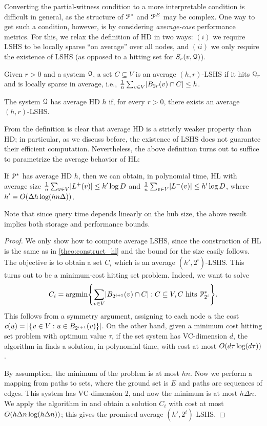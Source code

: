 Converting the partial-witness condition to a more interpretable condition is difficult in general, as the structure of $\mathcal{P}^*$ and $\mathcal{P}^E$ may be complex. 
One way to get such a condition, however, is by considering \emph{average-case} performance metrics.
For this, we relax the definition of HD in two ways: $(i)$ we require LSHS to be locally sparse ``on average'' over all nodes, and
$(ii)$ we only require the existence of LSHS (as opposed to a hitting set for $S_r(v,\mathcal{Q})$).

\begin{definition}
Given $r>0$ and a system $\mathcal{Q}$, a set $C\subseteq V$ is an average $(h,r)$-LSHS if it hits $\mathcal{Q}_r$ and is locally sparse in average, i.e.,
$\frac{1}{n}\sum_{v\in V} \lvert B_{2r}(v)\cap C\rvert \leq h$.
\end{definition}
\begin{definition}[Average HD]
The system $\mathcal{Q}$ has average HD $h$ if, for every $r>0$, there exists an average $(h,r)$-LSHS.
\end{definition}

From the definition is clear that average HD is a strictly weaker property than HD; in particular, as we discuss before, the existence of LSHS does not guarantee their efficient computation.
Nevertheless, the above definition turns out to suffice to parametrize the average behavior of HL:
\begin{theorem}\label{theo:preproc_avg}
If $\mathcal{P}^*$ has average HD $h$, then we can obtain, in polynomial time, HL with average size 
$\frac{1}{n}\sum_{v\in V} \lvert L^+(v)\rvert \leq h'\log D$ and 
$\frac{1}{n}\sum_{v\in V} \lvert L^-(v)\rvert \leq h'\log D$,
where $h'=O(\Delta h\log (hn\Delta))$.
\end{theorem}
Note that since query time depends linearly on the hub size, the above result implies both storage and performance bounds.
\begin{proof}
We only show how to compute average LSHS, since the construction of HL is the same as in \cref{theo:construct_hl} and the bound for the size easily follows. 
The objective is to obtain a set $C_i$ which is an average $(h',2^i)$-LSHS.
This turns out to be a minimum-cost hitting set problem.
Indeed, we want to solve
\[
C_i = \arg\!\min\crl*{\sum_{v\in V}\abs{B_{2^{i+1}}(v)\cap C}: C\subseteq V, C \text{ hits } \PS_{2^i}}.
\]
This follows from a symmetry argument, assigning to each node $u$ the cost $c(u)=\lvert\{v\in V: u\in B_{2^{i+1}}(v)\}\rvert$.
On the other hand, given a minimum cost hitting set problem with optimum value $\tau$, if the set system has VC-dimension $d$, the algorithm in \cite{vc_dim_hitting} finds a solution, in polynomial time, with cost at most $O(d\tau\log(d\tau))$.

By assumption, the minimum of the problem is at most $hn$.
Now we perform a mapping from paths to sets, where the ground set is $E$ and paths are sequences of edges.
This system has VC-dimension 2, and now the minimum is at most $h\Delta n$.
We apply the algorithm in \cite{vc_dim_hitting} and obtain a solution $C_i$ with cost at most $O(h\Delta n\log(h\Delta n))$; this gives the promised average $(h',2^i)$-LSHS.
\end{proof}
